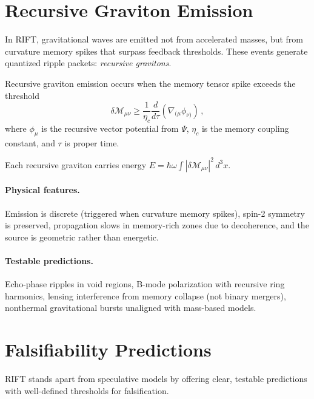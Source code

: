 \documentclass[12pt,a4paper]{article}
\begin{document}
\section{Recursive Graviton Emission}
\label{sec:graviton}

In RIFT, gravitational waves are emitted not from accelerated masses, but from
curvature memory spikes that surpass feedback thresholds. These events generate
quantized ripple packets: \emph{recursive gravitons}.

Recursive graviton emission occurs when the memory tensor spike exceeds the threshold
\begin{equation}
\delta\mathcal{M}_{\mu\nu} \geq \frac{1}{\eta_c}\frac{d}{d\tau}(\nabla_{(\mu}\phi_{\nu)})\,,
\end{equation}
where $\phi_\mu$ is the recursive vector potential from $\Psi$, $\eta_c$ is the memory
coupling constant, and $\tau$ is proper time.

Each recursive graviton carries energy
$E = \hbar\omega \int |\delta\mathcal{M}_{\mu\nu}|^2\,d^3x$.

\paragraph{Physical features.}
Emission is discrete (triggered when curvature memory spikes),
spin-2 symmetry is preserved, propagation slows in memory-rich zones due to decoherence,
and the source is geometric rather than energetic.

\paragraph{Testable predictions.}
Echo-phase ripples in void regions, B-mode polarization with recursive ring harmonics,
lensing interference from memory collapse (not binary mergers), nonthermal gravitational
bursts unaligned with mass-based models.

\section{Falsifiability Predictions}
\label{sec:falsifiability}

RIFT stands apart from speculative models by offering clear, testable predictions with
well-defined thresholds for falsification.
\end{document}
